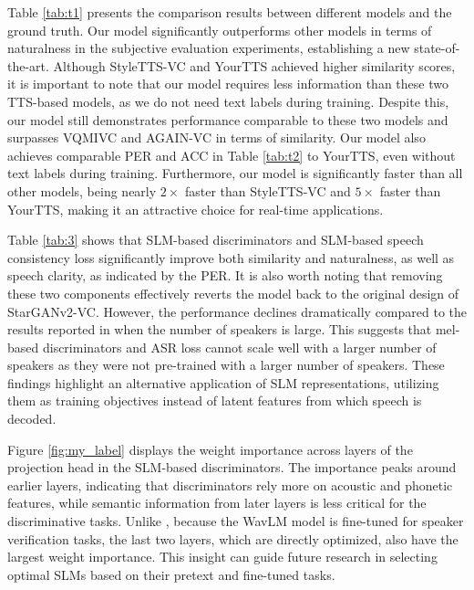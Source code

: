 \documentclass{article}
\begin{document}
\begin{sloppy}
\begin{figure}
\end{figure}
\label{sec:results}
Table \ref{tab:t1} presents the comparison results between different models and the ground truth. Our model significantly outperforms other models in terms of naturalness in the subjective evaluation experiments, establishing a new state-of-the-art. Although StyleTTS-VC and YourTTS achieved higher similarity scores, it is important to note that our model requires less information than these two TTS-based models, as we do not need text labels during training. Despite this, our model still demonstrates performance comparable to these two models and surpasses VQMIVC and AGAIN-VC in terms of similarity. Our model also achieves comparable PER and ACC in Table \ref{tab:t2} to YourTTS, even without text labels during training. Furthermore, our model is significantly faster than all other models, being nearly $2\times$ faster than StyleTTS-VC and $5\times$ faster than YourTTS, making it an attractive choice for real-time applications.

Table \ref{tab:3} shows that SLM-based discriminators and SLM-based speech consistency loss significantly improve both similarity and naturalness, as well as speech clarity, as indicated by the PER. It is also worth noting that removing these two components effectively reverts the model back to the original design of StarGANv2-VC. However, the performance declines dramatically compared to the results reported in \cite{li2021starganv2} when the number of speakers is large. This suggests that mel-based discriminators and ASR loss cannot scale well with a larger number of speakers as they were not pre-trained with a larger number of  speakers. These findings highlight an alternative application of SLM representations, utilizing them as training objectives instead of latent features from which speech is decoded.

Figure \ref{fig:my_label} displays the weight importance across layers of the projection head in the SLM-based discriminators. The importance peaks around earlier layers, indicating that discriminators rely more on acoustic and phonetic features, while semantic information from later layers is less critical for the discriminative tasks. Unlike \cite{li2023styletts2}, because the WavLM model is fine-tuned for speaker verification tasks, the last two layers, which are directly optimized, also have the largest weight importance. This insight can guide future research in selecting optimal SLMs based on their pretext and fine-tuned tasks.


\end{sloppy}
\end{document}
